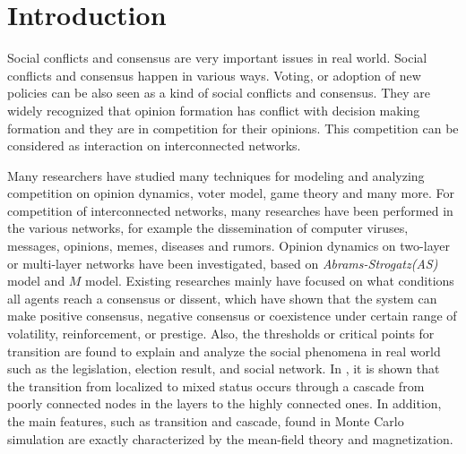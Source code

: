 \documentclass[review]{elsarticle}
\begin{document}
\section{Introduction}
Social conflicts and consensus are very important issues in real world. Social conflicts and consensus happen in various ways. Voting, or adoption of new policies can be also seen as a kind of social conflicts and consensus. They are widely recognized that opinion formation has conflict with decision making formation and they are in competition for their opinions. This competition can be considered as interaction on interconnected networks\cite{bianconi2018,domenico2013,tomasini2015,kimsangwoo2012,newman2010,boccaletti2014,mikko2014,fangwu2004}. 

Many researchers have studied many techniques for modeling and analyzing competition on opinion dynamics\cite{amato2017,quattrociocchi2014,haibo2017, hua2014}, voter model\cite{redner2017}, game theory\cite{smyrnakis2019} and many more\cite{danziger2019,namkhanhvu2017,laguna2004,masuda2014,zuev2012, shenyu2018, zhou2018}.  For competition of interconnected networks, many researches have been performed in the various networks, for example the dissemination of computer viruses, messages, opinions, memes, diseases and rumors\cite{hua2014,shenyu2018, zhou2018, alvarez2016,gomez2015,diep2017,rocca2014,velasquez2018}. Opinion dynamics on two-layer or multi-layer networks have been investigated, based on \textit{Abrams-Strogatz(AS)} model\cite{abrams2003,vazquez2010} and $M$ model\cite{rocca2014}. Existing researches mainly have focused on what conditions all agents reach a consensus or dissent, which have shown that the system can make positive consensus, negative consensus or coexistence under certain range of volatility, reinforcement, or prestige. Also, the thresholds or critical points for transition are found to explain and analyze the social phenomena in real world such as the legislation, election result, and social network\cite{amato2017, alvarez2016, diep2017}. In \cite{gomez2015}, it is shown that the transition from localized to mixed status occurs through a cascade from poorly connected nodes in the layers to the highly connected ones. In addition, the main features, such as transition and cascade, found in Monte Carlo simulation are exactly characterized by the mean-field theory and magnetization\cite{amato2017, alvarez2016, gomez2015, diep2017}.   
\end{document}
